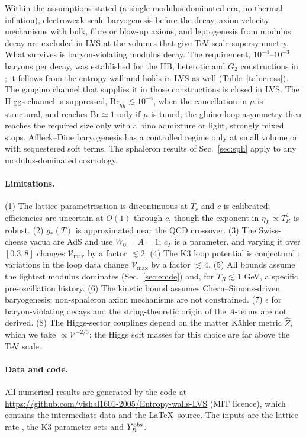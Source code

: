 \documentclass[11pt]{article}
\newcommand{\vol}{\mathcal{V}}
\begin{document}
Within the assumptions stated (a single modulus-dominated era, no thermal inflation), electroweak-scale baryogenesis before the decay, axion-velocity mechanisms with bulk, fibre or blow-up axions, and leptogenesis from modulus decay are excluded in LVS at the volumes that give TeV-scale supersymmetry. What survives is baryon-violating modulus decay. The requirement, $10^{-4}$--$10^{-3}$ baryons per decay, was established for the IIB, heterotic and $G_2$ constructions in \cite{KW}; it follows from the entropy wall and holds in LVS as well (Table~\ref{tab:cross}). The gaugino channel that supplies it in those constructions is closed in LVS. The Higgs channel is suppressed, $\mathrm{Br}_{\tilde h\tilde h}\lesssim10^{-4}$, when the cancellation in $\mu$ is structural, and reaches $\mathrm{Br}\simeq1$ only if $\mu$ is tuned; the gluino-loop asymmetry then reaches the required size only with a bino admixture or light, strongly mixed stops. Affleck--Dine baryogenesis has a controlled regime only at small volume or with sequestered soft terms. The sphaleron results of Sec.~\ref{sec:sph} apply to any modulus-dominated cosmology.

\paragraph*{Limitations.} (1) The lattice parametrisation is discontinuous at $T_c$ and $c$ is calibrated; efficiencies are uncertain at $O(1)$ through $c$, though the exponent in $\eta_L\propto T_R^4$ is robust. (2) $g_*(T)$ is approximated near the QCD crossover. (3) The Swiss-cheese vacua are AdS and use $W_0=A=1$; $c_\Gamma$ is a parameter, and varying it over $[0.3,8]$ changes $\vol_{\max}$ by a factor $\lesssim2$. (4) The K3 loop potential is conjectural \cite{CBQ}; variations in the loop data change $\vol_{\max}$ by a factor $\lesssim4$. (5) All bounds assume the lightest modulus dominates (Sec.~\ref{sec:emde}) and, for $T_R\lesssim1$ GeV, a specific pre-oscillation history. (6) The kinetic bound assumes Chern--Simons-driven baryogenesis; non-sphaleron axion mechanisms are not constrained. (7) $\epsilon$ for baryon-violating decays and the string-theoretic origin of the $A$-terms are not derived. (8) The Higgs-sector couplings depend on the matter Kähler metric $\hat Z$, which we take $\propto\vol^{-2/3}$; the Higgs soft masses for this choice are far above the TeV scale.

\paragraph*{Data and code.} All numerical results are generated by the code at \url{https://github.com/vishal1601-2005/Entropy-walls-LVS} (MIT licence), which contains the intermediate data and the \LaTeX\ source. The inputs are the lattice rate \cite{DRT14}, the K3 parameter sets \cite{CBQ} and $Y_B^{\rm obs}$.
\end{document}
